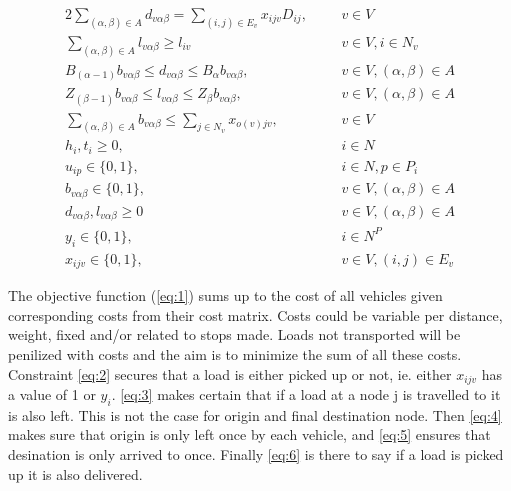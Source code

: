 \documentclass[a4paper,10pt]{article}
\begin{document}
\begin{alignat} {2}
    \sum_{(\alpha,\beta)\in A}d_{v\alpha\beta} = 
    \sum_{(i,j) \in E_v} x_{ijv}D_{ij},					& 	&&	v \in V						\label{eq:18}	\\[4pt]
    \sum_{(\alpha,\beta) \in A} l_{v\alpha\beta} \geq l_{iv}		&	&& 	v \in V, i \in N_v				\label{eq:19}	\\[4pt]
    B_{(\alpha-1)}b_{v\alpha\beta} \leq d_{v\alpha\beta} \leq 
    B_\alpha b_{v\alpha\beta},				        	& 	&&	v \in V, (\alpha, \beta) \in A			\label{eq:20}	\\[8pt]
    Z_{(\beta-1)}b_{v\alpha\beta} \leq l_{v\alpha\beta} \leq 
    Z_\beta b_{v\alpha\beta},				        	& 	&&	v \in V, (\alpha, \beta) \in A 			\label{eq:21}	\\[8pt]   	
    \sum_{(\alpha, \beta) \in A} b_{v\alpha\beta} \leq		
    \sum_{j\in N_v}x_{o(v)jv},                                          & 	&&	v \in V						\label{eq:22}	\\[4pt]
    h_i, t_i \geq 0,							& 	&&	i \in N 					\label{eq:23}	\\[8pt]
    u_{ip} \in \{0, 1\},						& 	&&	i \in N, p \in P_i 				\label{eq:24}	\\[8pt]
    b_{v\alpha\beta} \in \{0, 1\},					& 	&&	v \in V, (\alpha,\beta) \in A 			\label{eq:25}	\\[8pt]
    d_{v\alpha\beta}, l_{v\alpha\beta} \geq 0                           &       &&      v \in V, (\alpha,\beta) \in A 			\label{eq:26}	\\[8pt]
    y_i \in \{0, 1\},						        & 	&&	i \in N^P 					\label{eq:27}	\\[8pt]
    x_{ijv} \in \{0, 1\},						&	&&	v \in V, (i, j) \in E_v 			\label{eq:28}
\end{alignat} 
\endgroup

\par
The objective function (\ref{eq:1}) sums up to the cost of all vehicles given corresponding costs from their cost matrix. Costs could be variable per distance, weight, fixed and/or related to stops made. Loads not transported will be penilized with costs and the aim is to minimize the sum of all these costs.
Constraint \ref{eq:2} secures that a load is either picked up or not, ie. either $x_{ijv}$ has a value of 1 or $y_i$.
\ref{eq:3} makes certain that if a load at a node j is travelled to it is also left. This is not the case for origin and final destination node.
Then \ref{eq:4} makes sure that origin is only left once by each vehicle, 
and \ref{eq:5} ensures that desination is only arrived to once.
Finally \ref{eq:6} is there to say if a load is picked up it is also delivered. \par
\end{document}
